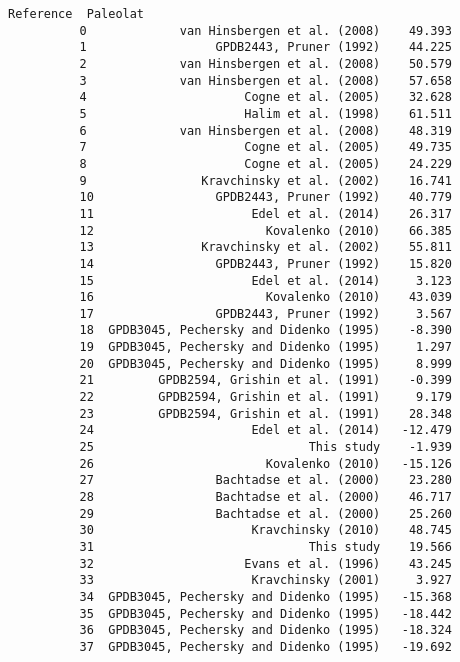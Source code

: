 \documentclass[11pt]{article}
\begin{document}
\begin{Verbatim}[commandchars=\\\{\}]
                                           Reference  Paleolat  
          0             van Hinsbergen et al. (2008)    49.393  
          1                  GPDB2443, Pruner (1992)    44.225  
          2             van Hinsbergen et al. (2008)    50.579  
          3             van Hinsbergen et al. (2008)    57.658  
          4                      Cogne et al. (2005)    32.628  
          5                      Halim et al. (1998)    61.511  
          6             van Hinsbergen et al. (2008)    48.319  
          7                      Cogne et al. (2005)    49.735  
          8                      Cogne et al. (2005)    24.229  
          9                Kravchinsky et al. (2002)    16.741  
          10                 GPDB2443, Pruner (1992)    40.779  
          11                      Edel et al. (2014)    26.317  
          12                        Kovalenko (2010)    66.385  
          13               Kravchinsky et al. (2002)    55.811  
          14                 GPDB2443, Pruner (1992)    15.820  
          15                      Edel et al. (2014)     3.123  
          16                        Kovalenko (2010)    43.039  
          17                 GPDB2443, Pruner (1992)     3.567  
          18  GPDB3045, Pechersky and Didenko (1995)    -8.390  
          19  GPDB3045, Pechersky and Didenko (1995)     1.297  
          20  GPDB3045, Pechersky and Didenko (1995)     8.999  
          21         GPDB2594, Grishin et al. (1991)    -0.399  
          22         GPDB2594, Grishin et al. (1991)     9.179  
          23         GPDB2594, Grishin et al. (1991)    28.348  
          24                      Edel et al. (2014)   -12.479  
          25                              This study    -1.939  
          26                        Kovalenko (2010)   -15.126  
          27                 Bachtadse et al. (2000)    23.280  
          28                 Bachtadse et al. (2000)    46.717  
          29                 Bachtadse et al. (2000)    25.260  
          30                      Kravchinsky (2010)    48.745  
          31                              This study    19.566  
          32                     Evans et al. (1996)    43.245  
          33                      Kravchinsky (2001)     3.927  
          34  GPDB3045, Pechersky and Didenko (1995)   -15.368  
          35  GPDB3045, Pechersky and Didenko (1995)   -18.442  
          36  GPDB3045, Pechersky and Didenko (1995)   -18.324  
          37  GPDB3045, Pechersky and Didenko (1995)   -19.692  
\end{Verbatim}
        
\end{document}
